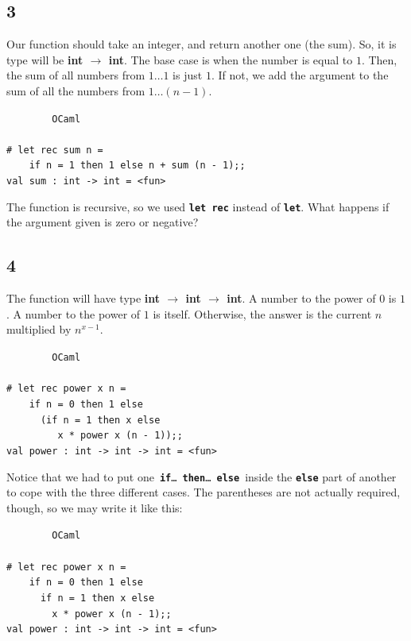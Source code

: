 \documentclass[]{book}
\newcommand{\pif}{\textbf{if}\xspace}
\newcommand{\pthen}{\textbf{then}\xspace}
\newcommand{\pelse}{\textbf{else}\xspace}
\newcommand{\smspace}{\vspace{4mm}}
\begin{document}
\subsection*{3}
Our function should take an integer, and return another one (the sum). So, it is type will be \textbf{\textrm{int $\rightarrow$ int}}. The base case is when the number is equal to $1$. Then, the sum of all numbers from $1\ldots 1$ is just $1$. If not, we add the argument to the sum of all the numbers from $1\ldots (n - 1)$.

\smspace
\noindent\verb!        OCaml!\\
\noindent\\
\noindent\verb!# let rec sum n =!\\
\noindent\verb!    if n = 1 then 1 else n + sum (n - 1);;!\\
\noindent\verb!val sum : int -> int = <fun>!
\smspace

\noindent The function is recursive, so we used \texttt{\textbf{let rec}} instead of \texttt{\textbf{let}}. What happens if the argument given is zero or negative?

\subsection*{4}
The function will have type \textrm{\textbf{int $\rightarrow$ int $\rightarrow$ int}}. A number to the power of $0$ is $1$. A number to the power of $1$ is itself. Otherwise, the answer is the current $n$ multiplied by $n^{x - 1}$.

\smspace
\noindent\verb!        OCaml!\\
\noindent\\
\noindent\verb!# let rec power x n =!\\
\noindent\verb!    if n = 0 then 1 else!\\
\noindent\verb!      (if n = 1 then x else!\\
\noindent\verb!         x * power x (n - 1));;!\\
\noindent\verb!val power : int -> int -> int = <fun>!
\smspace

\noindent Notice that we had to put one\, \texttt{\pif\ldots\ \pthen\ldots\ \pelse}\, inside the \texttt{\textbf{else}} part of another to cope with the three different cases. The parentheses are not actually required, though, so we may write it like this:

\smspace
\noindent\verb!        OCaml!\\
\noindent\\
\noindent\verb!# let rec power x n =!\\
\noindent\verb!    if n = 0 then 1 else!\\
\noindent\verb!      if n = 1 then x else!\\
\noindent\verb!        x * power x (n - 1);;!\\
\noindent\verb!val power : int -> int -> int = <fun>!
\smspace
\end{document}
